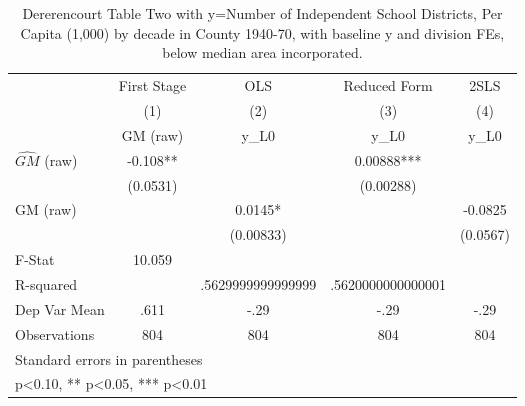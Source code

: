 \begin{table}[htbp]\centering
\def\sym#1{\ifmmode^{#1}\else\(^{#1}\)\fi}
\caption{Dererencourt Table Two with y=Number of Independent School Districts, Per Capita (1,000) by decade in County 1940-70, with baseline y and division FEs, below median area incorporated.}
\begin{tabular}{l*{4}{c}}
\toprule
                    & First Stage   &         OLS   &Reduced Form   &        2SLS   \\
                    &\multicolumn{1}{c}{(1)}&\multicolumn{1}{c}{(2)}&\multicolumn{1}{c}{(3)}&\multicolumn{1}{c}{(4)}\\
                    &\multicolumn{1}{c}{GM  (raw)}&\multicolumn{1}{c}{y\_L0}&\multicolumn{1}{c}{y\_L0}&\multicolumn{1}{c}{y\_L0}\\
\midrule
$\hat{GM}$ (raw)    &      -0.108** &               &     0.00888***&               \\
                    &    (0.0531)   &               &   (0.00288)   &               \\
\addlinespace
GM  (raw)           &               &      0.0145*  &               &     -0.0825   \\
                    &               &   (0.00833)   &               &    (0.0567)   \\
\midrule
F-Stat              &      10.059   &               &               &               \\
R-squared           &               &.5629999999999999   &.5620000000000001   &               \\
Dep Var Mean        &        .611   &        -.29   &        -.29   &        -.29   \\
Observations        &         804   &         804   &         804   &         804   \\
\bottomrule
\multicolumn{5}{l}{\footnotesize Standard errors in parentheses}\\
\multicolumn{5}{l}{\footnotesize * p<0.10, ** p<0.05, *** p<0.01}\\
\end{tabular}
\end{table}
